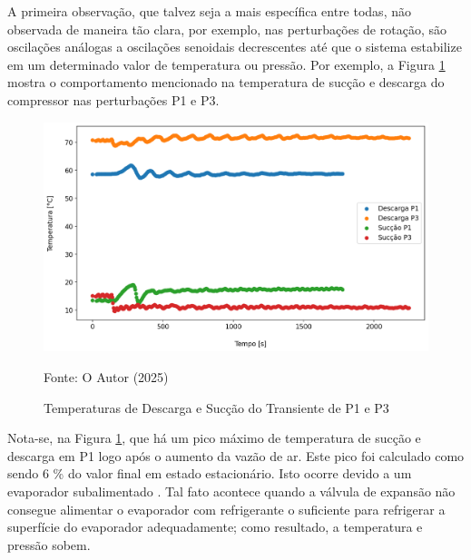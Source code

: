 A primeira observação, que talvez seja a mais específica entre todas, não observada de maneira tão clara, por exemplo, nas perturbações de rotação, são oscilações análogas a oscilações senoidais decrescentes até que o sistema estabilize em um determinado valor de temperatura ou pressão. Por exemplo, a Figura \ref{fig:TempSuccaoPertubacaoVentilador} mostra o comportamento mencionado na temperatura de sucção e descarga do compressor nas perturbações P1 e P3.
\newpage
\begin{figure}[h]
    \centering
    \includegraphics[width=1\linewidth]{FigurasdoTexto/Temperaturas de descarga e sucção Transiente P1 e P3.png}
    \caption{Temperaturas de Descarga e Sucção do Transiente de P1 e P3}
    \label{fig:TempSuccaoPertubacaoVentilador}
    {\footnotesize Fonte: O Autor (2025)}
\end{figure}

Nota-se, na Figura \ref{fig:TempSuccaoPertubacaoVentilador}, que há um pico máximo de temperatura de sucção e descarga em P1 logo após o aumento da vazão de ar. Este pico foi calculado como sendo 6 \% do valor final em estado estacionário. Isto ocorre devido a um evaporador subalimentado \cite{StoekerRefrigeration}. Tal fato acontece quando a válvula de expansão não consegue alimentar o evaporador com refrigerante o suficiente para refrigerar a superfície do evaporador adequadamente; como resultado, a temperatura e pressão sobem.

